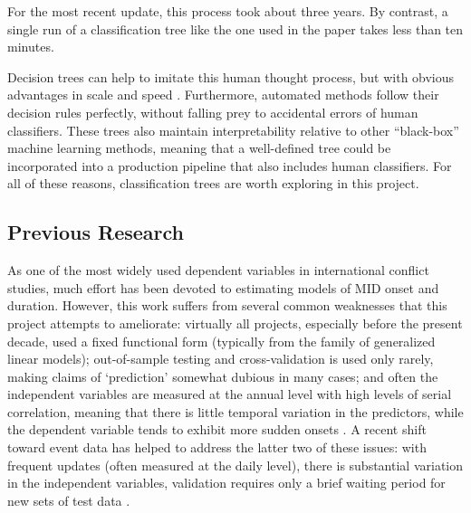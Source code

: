 \documentclass[12pt,letterpaper]{article}
\begin{document}
For the most recent update, this process took about three years. By contrast, a single run of a classification tree like the one used in the paper takes less than ten minutes. 

Decision trees can help to imitate this human thought process, but with obvious advantages in scale and speed \citep{king2003automated, mikhaylov2012coder, ruggeri2011events}. Furthermore, automated methods follow their decision rules perfectly, without falling prey to accidental errors of human classifiers. These trees also maintain interpretability relative to other ``black-box'' machine learning methods, meaning that a well-defined tree could be incorporated into a production pipeline that also includes human classifiers. For all of these reasons, classification trees are worth exploring in this project. 

\subsection{Previous Research}

As one of the most widely used dependent variables in international conflict studies, much effort has been devoted to estimating models of MID onset and duration. However, this work suffers from several common weaknesses that this project attempts to ameliorate: virtually all projects, especially before the present decade, used a fixed functional form (typically from the family of generalized linear models); out-of-sample testing and cross-validation is used only rarely, making claims of `prediction' somewhat dubious in many cases; and often the independent variables are measured at the annual level with high levels of serial correlation, meaning that there is little temporal variation in the predictors, while the dependent variable tends to exhibit more sudden onsets \citep{ward2010perils}. A recent shift toward event data has helped to address the latter two of these issues: with frequent updates (often measured at the daily level), there is substantial variation in the independent variables, validation requires only a brief waiting period for new sets of test data \citep{gerner1994,gerner:etal:2002,king2003automated,ruggeri2011events,schrodt2013gdelt}. 
\end{document}
